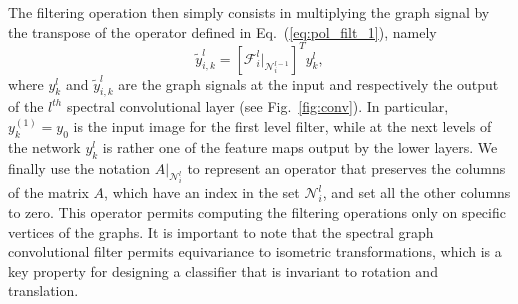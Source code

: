 \documentclass[10pt,journal,compsoc]{IEEEtran}
\begin{document}
	The filtering operation then simply consists in multiplying the graph signal by the transpose of the operator defined in Eq.~(\ref{eq:pol_filt_1}), namely
	\begin{equation}
	\tilde{y}_{i,k}^{l} =\left[\mathcal{F}_i^{l}|_{\mathcal{N}_i^{l-1}}\right]^T y_k^{l} ,
	\label{eq:pol_filt_2}
	\end{equation}
	\noindent
	where $y_k^{l}$ and $\tilde{y}_{i,k}^{l}$ are the graph signals at the input and respectively the output of the $l^{th}$ spectral convolutional layer (see Fig.~\ref{fig:conv}). In particular, $y_k^{(1)} = y_0$ is the input image for the first level filter, while at the next levels of the network $y_k^{l}$ is rather one of the feature maps output by the lower layers. We finally use the notation $A |_{\mathcal{N}_i^{l}}$ to represent an operator that preserves the columns of the matrix $A$, which have an index in the set ${\mathcal{N}_i^{l}}$, and set all the other columns to zero. This operator permits computing the filtering operations only on specific vertices of the graphs. It is important to note that the spectral graph convolutional filter permits equivariance to isometric transformations, which is a key property for designing a classifier that is invariant to rotation and translation.
\end{document}
